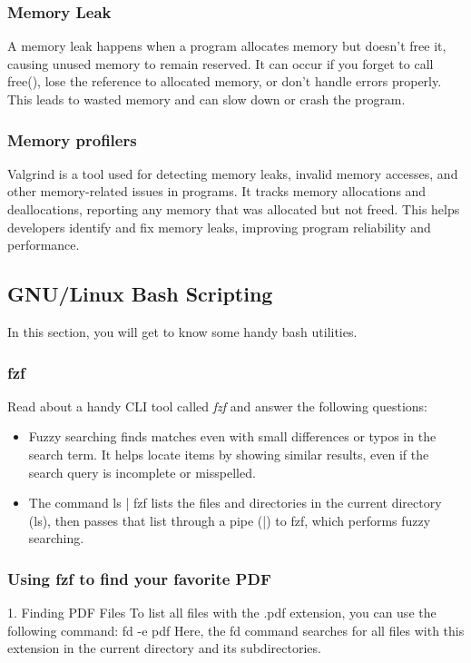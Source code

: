 \documentclass[12pt]{article}
\begin{document}
\subsubsection{Memory Leak}
A memory leak happens when a program allocates memory but doesn't free it, causing unused memory to remain reserved. It can occur if you forget to call free(), lose the reference to allocated memory, or don't handle errors properly. This leads to wasted memory and can slow down or crash the program.
\subsubsection{Memory profilers}
Valgrind is a tool used for detecting memory leaks, invalid memory accesses, and other memory-related issues in programs. It tracks memory allocations and deallocations, reporting any memory that was allocated but not freed. This helps developers identify and fix memory leaks, improving program reliability and performance.

\subsection{GNU/Linux Bash Scripting}
In this section, you will get to know some handy bash utilities.

\subsubsection{fzf}
Read about a handy CLI tool called \textit{fzf} and answer the following questions:

\begin{itemize}
    \item Fuzzy searching finds matches even with small differences or typos in the search term. It helps locate items by showing similar results, even if the search query is incomplete or misspelled.
    \item The command ls | fzf lists the files and directories in the current directory (ls), then passes that list through a pipe (|) to fzf, which performs fuzzy searching.
\end{itemize}

\subsubsection{Using fzf to find your favorite PDF}
1. Finding PDF Files
To list all files with the .pdf extension, you can use the following command:
fd -e pdf
Here, the fd command searches for all files with this extension in the current directory and its subdirectories.
\end{document}
